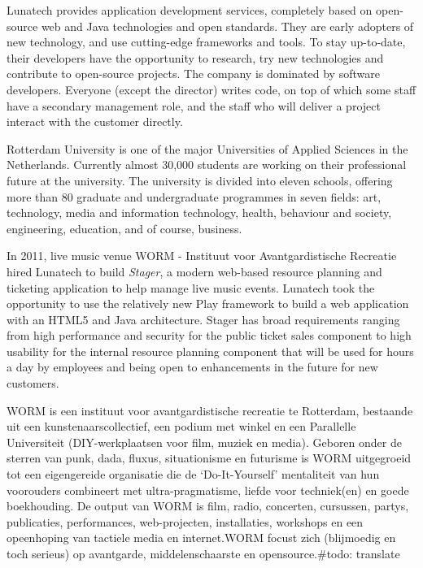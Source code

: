 Lunatech provides application development services, completely based on open-source web and Java technologies and open standards. They are early adopters of new technology, and use cutting-edge frameworks and tools. To stay up-to-date, their developers have the opportunity to research, try new technologies and contribute to open-source projects. The company is dominated by software developers. Everyone (except the director) writes code, on top of which some staff have a secondary management role, and the staff who will deliver a project interact with the customer directly.

Rotterdam University is one of the major Universities of Applied Sciences in the Netherlands. Currently almost 30,000 students are working on their professional future at the university.
The university is divided into eleven schools, offering more than 80 graduate and undergraduate programmes in seven fields: art, technology, media and information technology, health, behaviour and society, engineering, education, and of course, business.\cite{HogeschoolRotterdam2012}

In 2011, live music venue WORM - Instituut voor Avantgardistische Recreatie hired Lunatech to build \emph{Stager}, a modern web-based resource planning and ticketing application to help manage live music events. Lunatech took the opportunity to use the relatively new Play framework to build a web application with an HTML5 and Java architecture. Stager has broad requirements ranging from high performance and security for the public ticket sales component to high usability for the internal resource planning component that will be used for hours a day by employees and being open to enhancements in the future for new customers. \cite{Lunatech2011} %

WORM is een instituut voor avantgardistische recreatie te Rotterdam, bestaande uit een kunstenaarscollectief, een podium met winkel en een Parallelle Universiteit (DIY-werkplaatsen voor film, muziek en media). Geboren onder de sterren van punk, dada, fluxus, situationisme en futurisme is WORM uitgegroeid tot een eigengereide organisatie die de ‘Do-It-Yourself’ mentaliteit van hun voorouders combineert met ultra-pragmatisme, liefde voor techniek(en) en goede boekhouding. De output van WORM is film, radio, concerten, cursussen, partys, publicaties, performances, web-projecten, installaties, workshops en een opeenhoping van tactiele media en internet.WORM focust zich (blijmoedig en toch serieus) op avantgarde, middelenschaarste en opensource.\#todo: translate \cite{WORM2012} %

